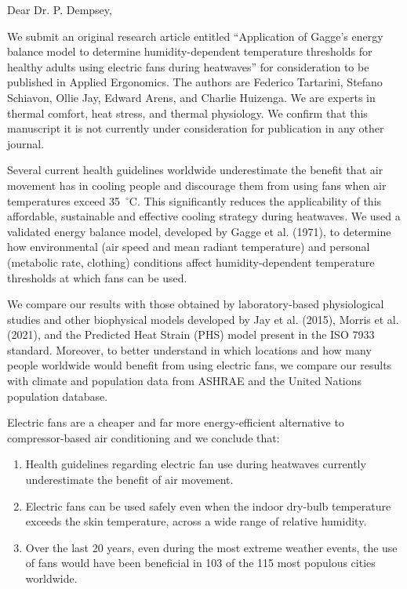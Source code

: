 \documentclass[11pt,a4paper,roman]{moderncv}        %
\begin{document}
\date{\today}
\opening{Dear Dr. P. Dempsey,}

\makelettertitle

We submit an original research article entitled ``Application of Gagge's energy balance model to determine humidity-dependent temperature thresholds for healthy adults using electric fans during heatwaves'' for consideration to be published in Applied Ergonomics.
The authors are Federico Tartarini, Stefano Schiavon, Ollie Jay, Edward Arens, and Charlie Huizenga.
We are experts in thermal comfort, heat stress, and thermal physiology.
We confirm that this manuscript it is not currently under consideration for publication in any other journal.

Several current health guidelines worldwide underestimate the benefit that air movement has in cooling people and discourage them from using fans when air temperatures exceed 35~$^{\circ}$C.
This significantly reduces the applicability of this affordable, sustainable and effective cooling strategy during heatwaves.
We used a validated energy balance model, developed by Gagge et al. (1971), to determine how environmental (air speed and mean radiant temperature) and personal (metabolic rate, clothing) conditions affect humidity-dependent temperature thresholds at which fans can be used.

We compare our results with those obtained by laboratory-based physiological studies and other biophysical models developed by Jay et al. (2015), Morris et al. (2021), and the Predicted Heat Strain (PHS) model present in the ISO 7933 standard. Moreover, to better understand in which locations and how many people worldwide would benefit from using electric fans, we compare our results with climate and population data from ASHRAE and the United Nations population database.

Electric fans are a cheaper and far more energy-efficient alternative to compressor-based air conditioning and we conclude that:
\begin{enumerate}[itemindent=.5cm,nolistsep]
    \item Health guidelines regarding electric fan use during heatwaves currently underestimate the benefit of air movement.
    \item Electric fans can be used safely even when the indoor dry-bulb temperature exceeds the skin temperature, across a wide range of relative humidity.
    \item Over the last 20 years, even during the most extreme weather events, the use of fans would have been beneficial in 103 of the 115 most populous cities worldwide.
\end{enumerate}
\end{document}
